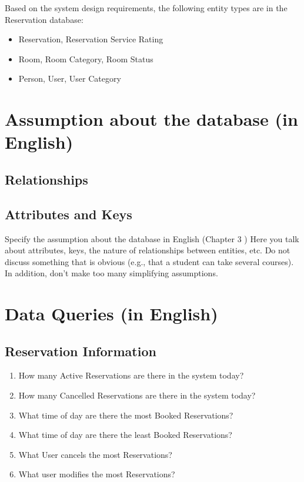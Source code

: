 \documentclass[11pt]{report}
\begin{document}
Based on the system design requirements, the following entity types are in the Reservation database:
\begin{itemize}
    \item Reservation,  Reservation Service Rating
    \item Room, Room Category, Room Status
    \item Person, User, User Category
\end{itemize}

\section*{Assumption about the database (in English)}
\subsection*{Relationships}


\subsection*{Attributes and Keys}

Specify the assumption about the database in English 
(Chapter 3
) 
Here you talk about attributes,
 keys, the nature of relationships between entities, etc. Do not 
discuss something that is obvious (e.g.,
 that a student can take several courses). In addition,
don't make too many simplifying assumptions.


\section*{Data Queries (in English)}
\subsection*{Reservation Information}
\begin{enumerate}
\item How many Active Reservations are there in the system today?
\item How many Cancelled Reservations are there in the system today?
\item What time of day are there the most Booked Reservations?
\item What time of day are there the least Booked Reservations?
\item What User cancels the most Reservations?
\item What user modifies the most Reservations?
\end{enumerate}
\end{document}
